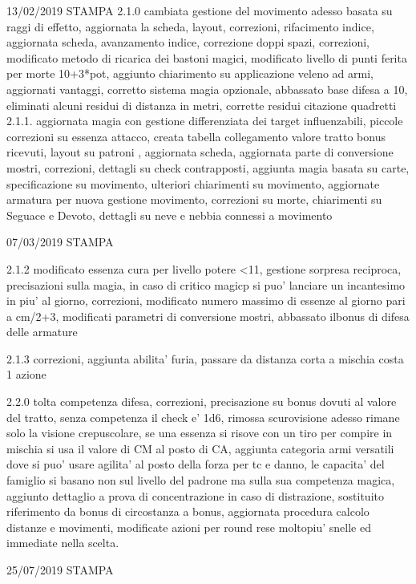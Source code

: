 \documentclass[a4paper,11pt,twoside,openany]{book}
\begin{document}
{{			13/02/2019 STAMPA
			2.1.0 cambiata gestione del movimento adesso basata su raggi di effetto, aggiornata la scheda, layout, correzioni, rifacimento indice, aggiornata scheda, avanzamento indice, correzione doppi spazi, correzioni, modificato metodo di ricarica dei bastoni magici, modificato livello di punti ferita per morte 10+3*pot, aggiunto chiarimento su applicazione veleno ad armi, aggiornati vantaggi, corretto sistema magia opzionale, abbassato base difesa a 10, eliminati alcuni residui di distanza in metri, corrette residui citazione quadretti 2.1.1. aggiornata magia con gestione differenziata dei target influenzabili, piccole correzioni su essenza attacco, creata tabella collegamento valore tratto bonus ricevuti, layout su patroni , aggiornata scheda, aggiornata parte di conversione mostri, correzioni, dettagli su check contrapposti, aggiunta magia basata su carte, specificazione su movimento, ulteriori chiarimenti su movimento, aggiornate armatura per nuova gestione movimento, correzioni su morte, chiarimenti su Seguace e Devoto, dettagli su neve e nebbia connessi a movimento
			
			07/03/2019 STAMPA
			
			2.1.2 modificato essenza cura per livello potere \textless11, gestione sorpresa reciproca, precisazioni sulla magia, in caso di critico magicp si puo' lanciare un incantesimo in piu' al giorno, correzioni, modificato numero massimo di essenze al giorno pari a cm/2+3, modificati parametri di conversione mostri, abbassato ilbonus di difesa delle armature 
			
			2.1.3 correzioni, aggiunta abilita' furia, passare da distanza corta a mischia costa 1 azione
			
			2.2.0 tolta competenza difesa, correzioni, precisazione su bonus dovuti al valore del tratto, senza competenza il check e’ 1d6, rimossa scurovisione adesso rimane solo la visione crepuscolare, se una essenza si risove con un tiro per compire in mischia si usa il valore di CM al posto di CA, aggiunta categoria armi versatili dove si puo’ usare agilita’ al posto della forza per tc e danno, le capacita’ del famiglio si basano non sul livello del padrone ma sulla sua competenza magica, aggiunto dettaglio a prova di concentrazione in caso di distrazione, sostituito riferimento da bonus di circostanza a bonus, aggiornata procedura calcolo distanze e movimenti, modificate azioni per round rese moltopiu’ snelle ed immediate nella scelta.
			
			25/07/2019 STAMPA
			
}}
\end{document}
